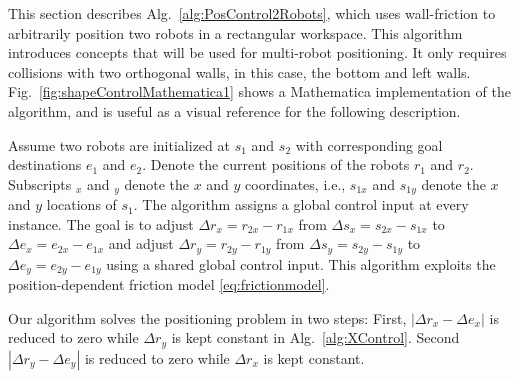 \begin{figure*}
\caption{\label{fig:shapeControlMathematica1}{Frames from an implementation of Alg.\ \ref{alg:PosControl2Robots}: two robot positioning using walls with infinite friction. The algorithm only requires friction along the bottom and left walls.
Robot initial positions are shown by a crosshair, and final positions by a circled crosshair.  Dashed lines show the shortest route if robots could be controlled independently.  Solid arrows show path given by  Alg.\ \ref{alg:PosControl2Robots}.
Online demonstration and source code at \citep{Shahrokhi2015mathematicaParticle}.
}
}
\end{figure*}

This section describes Alg.~\ref{alg:PosControl2Robots}, which uses wall-friction to arbitrarily position two robots in a rectangular workspace.  This algorithm  introduces concepts that will be used for multi-robot positioning. It only requires collisions with two orthogonal walls, in this case, the bottom and left walls. Fig.~\ref{fig:shapeControlMathematica1} shows a Mathematica implementation of the algorithm, and is useful as a visual reference for the following description.

Assume two robots are initialized at $s_1$ and $s_2$ with corresponding goal destinations $e_1$ and $e_2$. 
Denote the current positions of the robots  $r_1$ and $r_2$. 
Subscripts $_x$ and $_y$ denote the $x$ and $y$ coordinates, i.e., $s_{1x}$ and $s_{1y}$ denote the $x$ and $y$ locations of $s_1$. 
The algorithm assigns a global control input at every instance.
The goal is to adjust 
 $\Delta r_x = r_{2x}-r_{1x}$ from $\Delta s_x = s_{2x}-s_{1x}$ to $\Delta e_x = e_{2x}-e_{1x}$ and  adjust 
 $\Delta r_y = r_{2y}-r_{1y}$ from $\Delta s_y = s_{2y}-s_{1y}$ to $\Delta e_y = e_{2y}-e_{1y}$ using a shared global control input. 
 This algorithm exploits the position-dependent friction model \eqref{eq:frictionmodel}.

Our algorithm solves the positioning problem in two steps: 
First, $|\Delta r_x - \Delta e_x |$ is reduced to zero while  $\Delta r_y$ is kept constant in Alg.~\ref{alg:XControl}. 
Second $|\Delta r_y - \Delta e_y |$ is reduced to zero while  $\Delta r_x$ is kept constant.%

